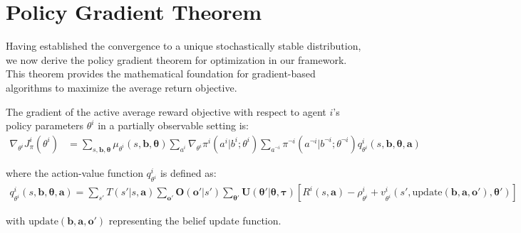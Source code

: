 \section{Policy Gradient Theorem}
Having established the convergence to a unique stochastically stable distribution,
we now derive the policy gradient theorem for optimization in our framework. This
theorem provides the mathematical foundation for gradient-based algorithms to maximize
the average return objective.
\label{appendix:avg_gradient}
\begin{theorem}
    The gradient of the active average reward objective
    with respect to agent $i$'s policy parameters $\theta^{i}$ in a partially observable
    setting is:
    \begin{align}
        \nabla_{\theta^i}J^{i}_{\pi}(\theta^{i}) & = \sum_{s, \boldsymbol{b}, \boldsymbol{\theta}}\mu_{\theta^i}(s, \boldsymbol{b}, \boldsymbol{\theta}) \sum_{a^i}\nabla_{\theta^i}\pi^{i}(a^{i}|b^{i}; \theta^{i}) \sum_{a^{\neg i}}\pi^{\neg i}(a^{\neg i}|b^{\neg i}; \theta^{\neg i}) q^{i}_{\theta^i}(s, \boldsymbol{b}, \boldsymbol{\theta}, \boldsymbol{a})
    \end{align}

    where the action-value function $q^{i}_{\theta^i}$ is defined as:
    \begin{align}
        q^{i}_{\theta^i}(s, \boldsymbol{b}, \boldsymbol{\theta}, \boldsymbol{a}) = \sum_{s'}T(s'|s, \boldsymbol{a}) \sum_{\boldsymbol{o}'}\boldsymbol{O}(\boldsymbol{o}'|s') \sum_{\boldsymbol{\theta}'}\boldsymbol{U}(\boldsymbol{\theta}'|\boldsymbol{\theta}, \boldsymbol{\tau}) \left[ R^{i}(s, \boldsymbol{a}) - \rho^{i}_{\theta^i}+ v^{i}_{\theta^i}(s', \text{update}(\boldsymbol{b}, \boldsymbol{a}, \boldsymbol{o}'), \boldsymbol{\theta}') \right]
    \end{align}

    with $\text{update}(\boldsymbol{b}, \boldsymbol{a}, \boldsymbol{o}')$ representing
    the belief update function.
\end{theorem}

